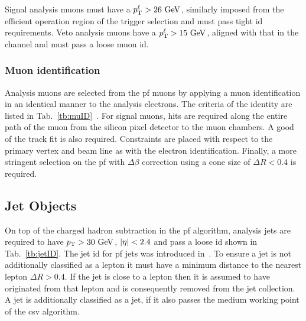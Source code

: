 Signal analysis muons must have a $p_{\mathrm{T}}^{\ell}>26\mathrm{~Ge\hspace{-.08em}V}^{}$, similarly imposed from the efficient operation region of the \muTrigger{} trigger selection and must pass tight \acrshort{id} requirements.
Veto analysis muons have a $p_{\mathrm{T}}^{\ell}>15\mathrm{~Ge\hspace{-.08em}V}^{}$, aligned with that in the \eJets{} channel and must pass a loose muon \acrshort{id}.

\subsubsection{Muon identification}
Analysis muons are selected from the \acrshort{pf} muons by applying a muon identification in an identical manner to the analysis electrons.
The criteria of the identity are listed in Tab.~\ref{tb:muID}~\cite{Event:MuonSF}.
For signal muons, hits are required along the entire path of the muon from the silicon pixel detector to the muon chambers.
A good \chisndf{} of the track fit is also required.
Constraints are placed with respect to the primary vertex and beam line as with the electron identification.
Finally, a more stringent selection on the \acrshort{pf} \Irel{} with $\Delta\beta$ correction using a cone size of $\Delta R < 0.4$ is required.


\subsection{Jet Objects}
\label{sec:jet}

On top of the charged hadron subtraction in the \acrshort{pf} algorithm, analysis jets are required to have $p_{\mathrm{T}}>30\mathrm{~Ge\hspace{-.08em}V}^{}$, $\lvert \eta \rvert<2.4$ and pass a loose \acrshort{id} shown in Tab.~\ref{tb:jetID}.
The jet \acrshort{id} for \acrshort{pf} jets was introduced in~\cite{Event:JetID}.
To ensure a jet is not additionally classified as a lepton it must have a minimum distance to the nearest lepton $\Delta R > 0.4$.
If the jet is close to a lepton then it is assumed to have originated from that lepton and is consequently removed from the jet collection. 
A jet is additionally classified as a \bquark{} jet, if it also passes the medium working point of the \acrshort{csv} algorithm.


